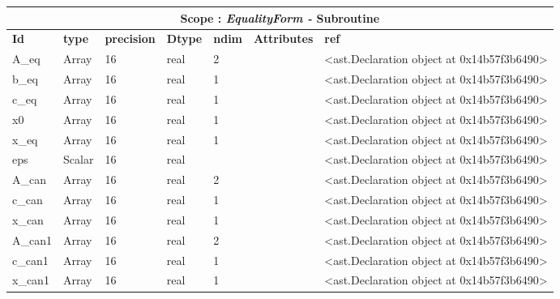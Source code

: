 \documentclass{report}
\begin{document}
 \vspace{1cm}

\begin{center}
\begin{longtable}{|p{3.5cm}|p{1.5cm}|p{1.5cm}|p{1.5cm}|p{1cm}|p{2cm}|p{4cm}| }
\hline
\multicolumn{7}{|c|}{\textbf{Scope : \qquad}  \textbf{\textit{EqualityForm - }Subroutine}}\\ 
\hline
\textbf{Id} & \textbf{type} & \textbf{precision} & \textbf{Dtype} & \textbf{ndim} & \textbf{Attributes} & \textbf{ref} \\\hline

A\_eq & Array & 16 & real & 2 &  & <ast.Declaration object at 0x14b57f3b6490> \\\hline

b\_eq & Array & 16 & real & 1 &  & <ast.Declaration object at 0x14b57f3b6490> \\\hline

c\_eq & Array & 16 & real & 1 &  & <ast.Declaration object at 0x14b57f3b6490> \\\hline

x0 & Array & 16 & real & 1 &  & <ast.Declaration object at 0x14b57f3b6490> \\\hline

x\_eq & Array & 16 & real & 1 &  & <ast.Declaration object at 0x14b57f3b6490> \\\hline

eps & Scalar & 16 & real &  &  & <ast.Declaration object at 0x14b57f3b6490> \\\hline

A\_can & Array & 16 & real & 2 &  & <ast.Declaration object at 0x14b57f3b6490> \\\hline

c\_can & Array & 16 & real & 1 &  & <ast.Declaration object at 0x14b57f3b6490> \\\hline

x\_can & Array & 16 & real & 1 &  & <ast.Declaration object at 0x14b57f3b6490> \\\hline

A\_can1 & Array & 16 & real & 2 &  & <ast.Declaration object at 0x14b57f3b6490> \\\hline

c\_can1 & Array & 16 & real & 1 &  & <ast.Declaration object at 0x14b57f3b6490> \\\hline

x\_can1 & Array & 16 & real & 1 &  & <ast.Declaration object at 0x14b57f3b6490> \\\hline


\end{longtable}
\end{center}
\end{document}
